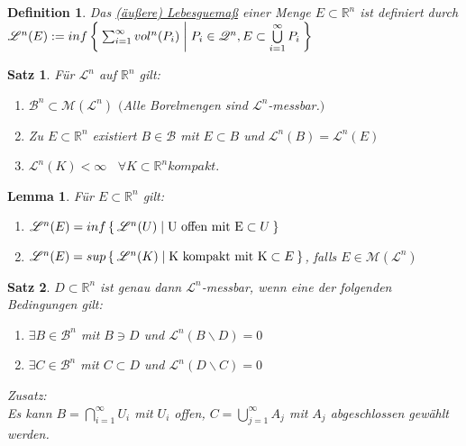 \documentclass[11pt]{memoir}
\theoremstyle{changebreak}
\newtheorem{Definition}{Definition}[chapter]
\newtheorem{Lemma}{Lemma}[chapter]
\newtheorem{Satz}{Satz}[chapter]
\begin{document}
\begin{Definition}
	Das \underline{(äußere) Lebesguemaß} einer Menge $E \subset \mathbb{R}^n$ ist definiert durch\\
	$ \mathscr{L}^n(E) := inf \Set{ \sum_{i = 1}^{\infty} vol^n(P_i) | P_i \in \mathscr{Q}^n, E \subset \bigcup\limits_{i = 1}^\infty P_i }$
\end{Definition}

\begin{Satz}
	Für $\mathscr{L}^n$ auf $\mathbb{R}^n$ gilt:
	\begin{enumerate}
		\item $\mathscr{B}^n \subset \mathscr{M}(\mathscr{L}^n)$ $($Alle Borelmengen sind $\mathscr{L}^n$-messbar.$)$
		\item Zu $E \subset \mathbb{R}^n$ existiert $B \in \mathscr{B}$ mit $E \subset B$
			und $\mathscr{L}^n(B) = \mathscr{L}^n(E)$
		\item $\mathscr{L}^n(K) < \infty$ \, $\forall K \subset \mathbb{R}^n kompakt.$
	\end{enumerate}
\end{Satz}

\begin{Lemma}
	Für $E \subset \mathbb{R}^n$ gilt:
	\begin{enumerate}
		\item $\mathscr{L}^n(E) = inf\Set{\mathscr{L}^n(U) | \text{U offen mit E} \subset{U}}$
		\item $\mathscr{L}^n(E) = sup\Set{\mathscr{L}^n(K) | \text{K kompakt mit K} \subset{E}}$,
			falls $E \in \mathscr{M}(\mathscr{L}^n)$
	\end{enumerate}
\end{Lemma}

\begin{Satz}
	$D \subset \mathbb{R}^n$ ist genau dann $\mathscr{L}^n$-messbar, wenn eine der folgenden Bedingungen gilt:
	\begin{enumerate}
		\item $\exists B \in \mathscr{B}^n$ mit $B \ni D$ und $\mathscr{L}^n(B \backslash D) = 0$
		\item $\exists C \in \mathscr{B}^n$ mit $C \subset D$ und $\mathscr{L}^n(D \backslash C) = 0$
	\end{enumerate}
	\textit{Zusatz:}\\
	Es kann $B = \bigcap\limits_{i = 1}^\infty U_i$ mit $U_i$ offen, $C = \bigcup\limits_{j = 1}^\infty A_j$ mit $A_j$
	abgeschlossen gewählt werden.
\end{Satz}
\end{document}
